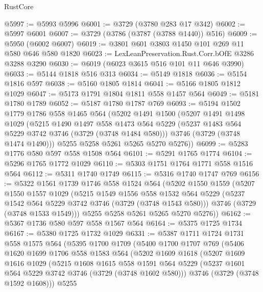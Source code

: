 \begin{lexlean}{RustCore}
\begin{coremodule}
@5997 := @5993 @5996
@6001 := @3729 (@3780 @283 @17 @342)
@6002 := @5997 @6001
@6007 := @3729 (@3786 (@3787 (@3788 @1440)) @516)
@6009 := @5950 (@6002 @6007)
@6019 := @3801 @601 @3803 @1450 @101 @269 @11 @580 @646 @580 @1820
@6023 := LexLeanPreservation.Rust.Corr.bOfE @3286 @3288 @3290
@6030 := @6019 (@6023 @3615 @516 @101 @11 @646 @3990)
@6033 := @5144 @1818 @516 @313
@6034 := @5149 @1818
@6036 := @5154 @1816 @597
@6038 := @5160 @1805 @1814
@6041 := @5166 @1805 @1812 @1029
@6047 := @5173 @1791 @1804 @1811 @558 @1457 @564
@6049 := @5181 @1780 @1789
@6052 := @5187 @1780 @1787 @769
@6093 := @5194
    @1502
    @1779
    @1786
    @558
    @1465
    @564
    (@5202
      @1491
      @1500
      (@5207
        @1491
        @1498
        @1029
        (@5215
          @1490
          @1497
          @558
          @1473
          @564
          @5229
          (@5237 @1483 @564 @5229 @3742 @3746 (@3729 (@3748 @1484 @580)))
          @3746
          (@3729 (@3748 @1474 @1490)))
        @5255
        @5258
        @5261
        @5265
        @5270
        @5276))
@6099 := @5283 @1776 @580 @597 @558 @1508 @564
@6101 := @5291 @1765 @1774
@6104 := @5296 @1765 @1772 @1029
@6110 := @5303 @1751 @1764 @1771 @558 @1516 @564
@6112 := @5311 @1740 @1749
@6115 := @5316 @1740 @1747 @769
@6156 := @5322
    @1561
    @1739
    @1746
    @558
    @1524
    @564
    (@5202
      @1550
      @1559
      (@5207
        @1550
        @1557
        @1029
        (@5215
          @1549
          @1556
          @558
          @1532
          @564
          @5229
          (@5237 @1542 @564 @5229 @3742 @3746 (@3729 (@3748 @1543 @580)))
          @3746
          (@3729 (@3748 @1533 @1549)))
        @5255
        @5258
        @5261
        @5265
        @5270
        @5276))
@6162 := @5367 @1736 @580 @597 @558 @1567 @564
@6164 := @5375 @1725 @1734
@6167 := @5380 @1725 @1732 @1029
@6331 := @5387
    @1711
    @1724
    @1731
    @558
    @1575
    @564
    (@5395
      @1700
      @1709
      (@5400
        @1700
        @1707
        @769
        (@5406
          @1620
          @1699
          @1706
          @558
          @1583
          @564
          (@5202
            @1609
            @1618
            (@5207
              @1609
              @1616
              @1029
              (@5215
                @1608
                @1615
                @558
                @1591
                @564
                @5229
                (@5237 @1601 @564 @5229 @3742 @3746 (@3729 (@3748 @1602 @580)))
                @3746
                (@3729 (@3748 @1592 @1608)))
              @5255

\end{coremodule}
\end{lexlean}
